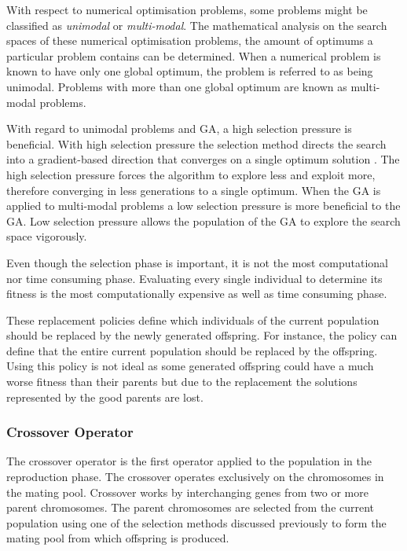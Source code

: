 With respect to numerical optimisation problems, some problems might be classified as \emph{unimodal} or \emph{multi-modal}\cite{FirstMathModel, CompuIntelligenceIntro}. The mathematical analysis on the search spaces of these numerical optimisation problems, the amount of optimums a particular problem contains can be determined\cite{FirstMathModel, CompuIntelligenceIntro}. When a numerical problem is known to have only one global optimum, the problem is referred to as being unimodal\cite{FirstMathModel, CompuIntelligenceIntro}. Problems with more than one global optimum are known as multi-modal problems\cite{FirstMathModel, CompuIntelligenceIntro}.

With regard to unimodal problems and \gls{GA}, a high selection pressure is beneficial\cite{ConstrainedGA}. With high selection pressure the selection method directs the search into a gradient-based direction that converges on a single optimum solution \cite{ConstrainedGA}. The high selection pressure forces the algorithm to explore less and exploit more, therefore converging in less generations to a single optimum. When the \gls{GA} is applied to multi-modal problems a low selection pressure is more beneficial to the \gls{GA}\cite{ConstrainedGA}. Low selection pressure allows the population of the \gls{GA} to explore the search space vigorously\cite{ConstrainedGA}.

Even though the selection phase is important, it is not the most computational nor time consuming phase. Evaluating every single individual to determine its fitness is the most computationally expensive as well as time consuming phase\cite{AcceleratingGA}. 

These replacement policies define which individuals of the current population should be replaced by the newly generated offspring\cite{CompuIntelligenceIntro}. For instance, the policy can define that the entire current population should be replaced by the offspring\cite{CompuIntelligenceIntro}. Using this policy is not ideal as some generated offspring could have a much worse fitness than their parents but due to the replacement the solutions represented by the good parents are lost\cite{CompuIntelligenceIntro}. 

\subsubsection{Crossover Operator}
\label{sec:crossover}
The crossover operator is the first operator applied to the population in the reproduction phase. The crossover operates exclusively on the chromosomes in the mating pool. Crossover works by interchanging genes from two or more parent chromosomes. The parent chromosomes are selected from the current population using one of the selection methods discussed previously to form the mating pool from which offspring is produced\cite{FamilyGA,HumanPassiveGA,CoactiveFuzzyGA}. 

